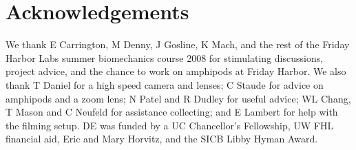 \documentclass{article}
\begin{document}
\section*{Acknowledgements}
We thank E Carrington, M Denny, J Gosline, K Mach, and the rest of the Friday Harbor Labs summer biomechanics course 2008 for stimulating discussions, project advice, and the chance to work on amphipods at Friday Harbor.  We also thank T Daniel for a high speed camera and lenses; C Staude for advice on amphipods and a zoom lens; N Patel and R Dudley for useful advice; WL Chang, T Mason and C Neufeld for assistance collecting; and E Lambert for help with the filming setup.  DE was funded by a UC Chancellor's Fellowship, UW FHL financial aid, Eric and Mary Horvitz, and the SICB Libby Hyman Award.


\end{document}

